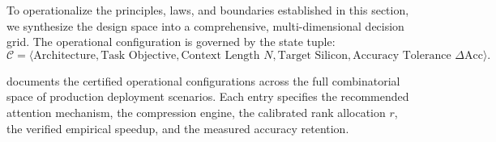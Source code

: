 To operationalize the principles, laws, and boundaries established in this section, we synthesize the design space into a comprehensive, multi-dimensional decision grid. The operational configuration is governed by the state tuple:
\begin{equation}
\mathcal{C} = \langle \text{Architecture}, \text{Task Objective}, \text{Context Length } N, \text{Target Silicon}, \text{Accuracy Tolerance } \Delta\text{Acc} \rangle.
\end{equation}

 documents the certified operational configurations across the full combinatorial space of production deployment scenarios. Each entry specifies the recommended attention mechanism, the compression engine, the calibrated rank allocation $r$, the verified empirical speedup, and the measured accuracy retention.

